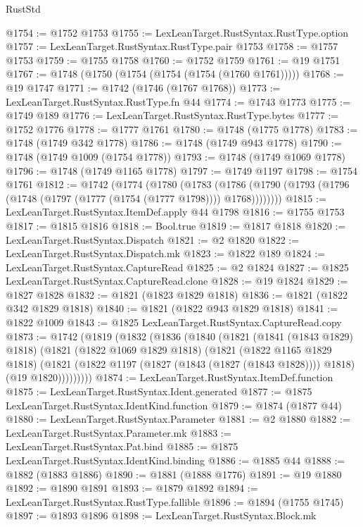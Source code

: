 \begin{lexlean}{RustStd}
\begin{coremodule}
@1754 := @1752 @1753
@1755 := LexLeanTarget.RustSyntax.RustType.option
@1757 := LexLeanTarget.RustSyntax.RustType.pair @1753
@1758 := @1757 @1753
@1759 := @1755 @1758
@1760 := @1752 @1759
@1761 := @19 @1751
@1767 := @1748 (@1750 (@1754 (@1754 (@1754 (@1760 @1761)))))
@1768 := @19 @1747
@1771 := @1742 (@1746 (@1767 @1768))
@1773 := LexLeanTarget.RustSyntax.RustType.fn @44
@1774 := @1743 @1773
@1775 := @1749 @189
@1776 := LexLeanTarget.RustSyntax.RustType.bytes
@1777 := @1752 @1776
@1778 := @1777 @1761
@1780 := @1748 (@1775 @1778)
@1783 := @1748 (@1749 @342 @1778)
@1786 := @1748 (@1749 @943 @1778)
@1790 := @1748 (@1749 @1009 (@1754 @1778))
@1793 := @1748 (@1749 @1069 @1778)
@1796 := @1748 (@1749 @1165 @1778)
@1797 := @1749 @1197
@1798 := @1754 @1761
@1812 := @1742
    (@1774
      (@1780
        (@1783
          (@1786 (@1790 (@1793 (@1796 (@1748 (@1797 (@1777 (@1754 (@1777 @1798)))) @1768))))))))
@1815 := LexLeanTarget.RustSyntax.ItemDef.apply @44 @1798
@1816 := @1755 @1753
@1817 := @1815 @1816
@1818 := Bool.true
@1819 := @1817 @1818
@1820 := LexLeanTarget.RustSyntax.Dispatch
@1821 := @2 @1820
@1822 := LexLeanTarget.RustSyntax.Dispatch.mk
@1823 := @1822 @189
@1824 := LexLeanTarget.RustSyntax.CaptureRead
@1825 := @2 @1824
@1827 := @1825 LexLeanTarget.RustSyntax.CaptureRead.clone
@1828 := @19 @1824
@1829 := @1827 @1828
@1832 := @1821 (@1823 @1829 @1818)
@1836 := @1821 (@1822 @342 @1829 @1818)
@1840 := @1821 (@1822 @943 @1829 @1818)
@1841 := @1822 @1009
@1843 := @1825 LexLeanTarget.RustSyntax.CaptureRead.copy
@1873 := @1742
    (@1819
      (@1832
        (@1836
          (@1840
            (@1821
              (@1841 (@1843 @1829) @1818)
              (@1821
                (@1822 @1069 @1829 @1818)
                (@1821
                  (@1822 @1165 @1829 @1818)
                  (@1821
                    (@1822 @1197 (@1827 (@1843 (@1827 (@1843 @1828)))) @1818)
                    (@19 @1820)))))))))
@1874 := LexLeanTarget.RustSyntax.ItemDef.function
@1875 := LexLeanTarget.RustSyntax.Ident.generated
@1877 := @1875 LexLeanTarget.RustSyntax.IdentKind.function
@1879 := @1874 (@1877 @44)
@1880 := LexLeanTarget.RustSyntax.Parameter
@1881 := @2 @1880
@1882 := LexLeanTarget.RustSyntax.Parameter.mk
@1883 := LexLeanTarget.RustSyntax.Pat.bind
@1885 := @1875 LexLeanTarget.RustSyntax.IdentKind.binding
@1886 := @1885 @44
@1888 := @1882 (@1883 @1886)
@1890 := @1881 (@1888 @1776)
@1891 := @19 @1880
@1892 := @1890 @1891
@1893 := @1879 @1892
@1894 := LexLeanTarget.RustSyntax.RustType.fallible
@1896 := @1894 (@1755 @1745)
@1897 := @1893 @1896
@1898 := LexLeanTarget.RustSyntax.Block.mk

\end{coremodule}
\end{lexlean}
